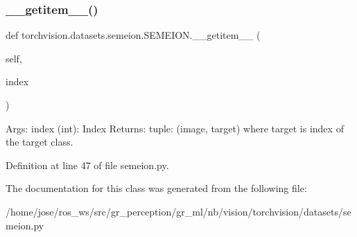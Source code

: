 \subsubsection{\texorpdfstring{\+\_\+\+\_\+getitem\+\_\+\+\_\+()}{\_\_getitem\_\_()}}
{\footnotesize\ttfamily def torchvision.\+datasets.\+semeion.\+S\+E\+M\+E\+I\+O\+N.\+\_\+\+\_\+getitem\+\_\+\+\_\+ (\begin{DoxyParamCaption}\item[{}]{self,  }\item[{}]{index }\end{DoxyParamCaption})}

\begin{DoxyVerb}Args:
    index (int): Index
Returns:
    tuple: (image, target) where target is index of the target class.
\end{DoxyVerb}
 

Definition at line 47 of file semeion.\+py.



The documentation for this class was generated from the following file\+:\begin{DoxyCompactItemize}
\item 
/home/jose/ros\+\_\+ws/src/gr\+\_\+perception/gr\+\_\+ml/nb/vision/torchvision/datasets/semeion.\+py\end{DoxyCompactItemize}
